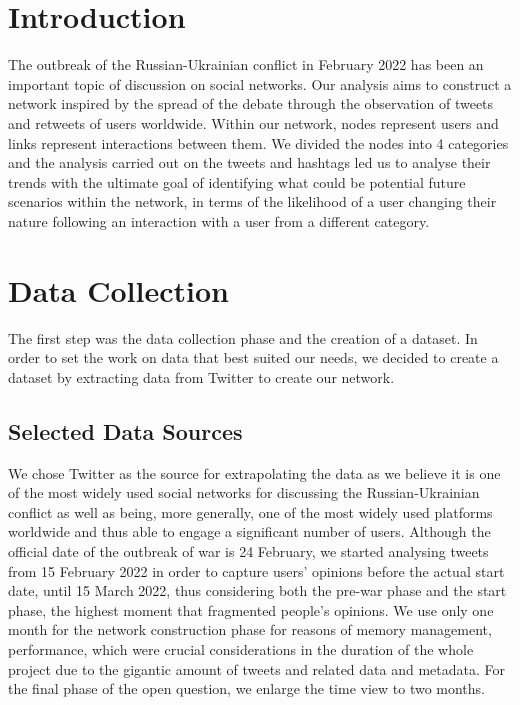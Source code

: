 \documentclass[sigchi]{acmart}
\begin{document}
\section{Introduction}
The outbreak of the Russian-Ukrainian conflict in February 2022 has been an important topic of discussion on social networks. Our analysis aims to construct a network inspired by the spread of the debate through the observation of tweets and retweets of users worldwide.
Within our network, nodes represent users and links represent interactions between them. We divided the nodes into 4 categories and the analysis carried out on the tweets and hashtags led us to analyse their trends with the ultimate goal of identifying what could be potential future scenarios within the network, in terms of the likelihood of a user changing their nature following an interaction with a user from a different category.


\section{Data Collection}
The first step was the data collection phase and the creation of a dataset. 
In order to set the work on data that best suited our needs, we decided to create a dataset by extracting data from Twitter to create our network. 


\subsection{Selected Data Sources}

We chose Twitter as the source for extrapolating the data as we believe it is one of the most widely used social networks for discussing the Russian-Ukrainian conflict as well as being, more generally, one of the most widely used platforms worldwide and thus able to engage a significant number of users. 
Although the official date of the outbreak of war is 24 February, we started analysing tweets from 15 February 2022 in order to capture users' opinions before the actual start date, until 15 March 2022, thus considering both the pre-war phase and the start phase, the highest moment that fragmented people's opinions. We use only one month for the network construction phase for reasons of memory management, performance, which were crucial considerations in the duration of the whole project due to the gigantic amount of tweets and related data and metadata. For the final phase of the open question, we enlarge the time view to two months.
\end{document}
